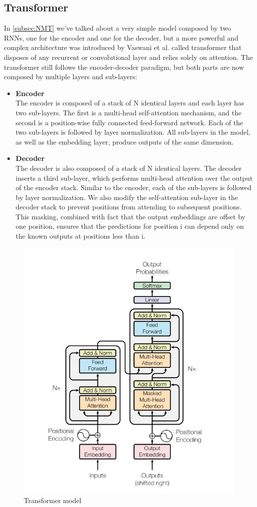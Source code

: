 \subsection{Transformer}\label{subsec:transformer_model}
In \ref{subsec:NMT} we've talked about a very simple model composed by two RNNs, one for the encoder and one for the decoder, but a more powerful and complex architecture was introduced by Vaswani et al. \cite{vaswani2017attention} called transformer that disposes of any recurrent or convolutional layer and relies solely on attention. The transformer still follows the encoder-decoder paradigm, but both parts are now composed by multiple layers and sub-layers:
\begin{itemize}
    \item \textbf{Encoder}\\
    The encoder is composed of a stack of N identical layers and each layer has two sub-layers. The first is a multi-head self-attention mechanism, and the second is a position-wise fully connected feed-forward network. Each of the two sub-layers is followed by layer normalization. All sub-layers in the model, as well as the embedding layer, produce outputs of the same dimension.
    \item \textbf{Decoder}\\
    The decoder is also composed of a stack of N identical layers. The decoder inserts a third sub-layer, which performs multi-head attention over the output of the encoder stack. Similar to the encoder, each of the sub-layers is followed by layer normalization. We also modify the self-attention sub-layer in the decoder stack to prevent positions from attending to subsequent positions. This masking, combined with fact that the output embeddings are offset by one position, ensures that the predictions for position i can depend only on the known outputs at positions less than i.
\end{itemize}
\begin{figure}[H]%
    \centering
    \includegraphics[width=0.68\linewidth]{images/transformer.png}
    \caption{Transformer model}
    \label{fig:transformer}
\end{figure}
